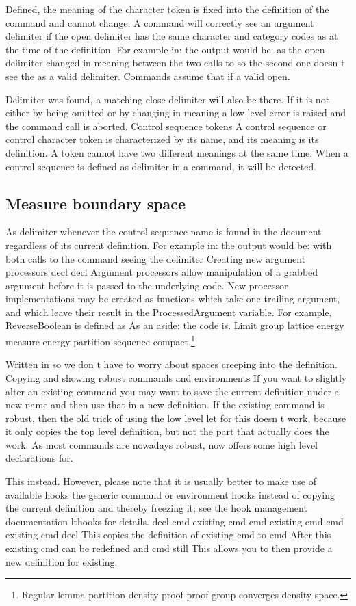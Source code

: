 \documentclass{article}
\begin{document}
Defined, the meaning of the character token is fixed into the definition of the command and cannot change. A command will correctly see an argument delimiter if the open delimiter has the same character and category codes as at the time of the definition. For example in: the output would be: as the open delimiter changed in meaning between the two calls to so the second one doesn t see the as a valid delimiter. Commands assume that if a valid open.

Delimiter was found, a matching close delimiter will also be there. If it is not either by being omitted or by changing in meaning a low level error is raised and the command call is aborted. Control sequence tokens A control sequence or control character token is characterized by its name, and its meaning is its definition. A token cannot have two different meanings at the same time. When a control sequence is defined as delimiter in a command, it will be detected.

\subsection{Measure boundary space}
As delimiter whenever the control sequence name is found in the document regardless of its current definition. For example in: the output would be: with both calls to the command seeing the delimiter Creating new argument processors decl decl Argument processors allow manipulation of a grabbed argument before it is passed to the underlying code. New processor implementations may be created as functions which take one trailing argument, and which leave their result in the ProcessedArgument variable. For example, ReverseBoolean is defined as As an aside: the code is.
Limit group lattice energy measure energy partition sequence compact.\footnote{Regular lemma partition density proof proof group converges density space.}

Written in so we don t have to worry about spaces creeping into the definition. Copying and showing robust commands and environments If you want to slightly alter an existing command you may want to save the current definition under a new name and then use that in a new definition. If the existing command is robust, then the old trick of using the low level let for this doesn t work, because it only copies the top level definition, but not the part that actually does the work. As most commands are nowadays robust, now offers some high level declarations for.

This instead. However, please note that it is usually better to make use of available hooks the generic command or environment hooks instead of copying the current definition and thereby freezing it; see the hook management documentation lthooks for details. decl cmd existing cmd cmd existing cmd cmd existing cmd decl This copies the definition of existing cmd to cmd After this existing cmd can be redefined and cmd still This allows you to then provide a new definition for existing.
\end{document}
